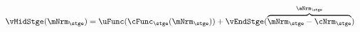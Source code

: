   \begin{equation}\begin{gathered}\begin{aligned}
\vMidStge(\mNrm_{\stge}) & = \uFunc(\cFunc_{\stge}(\mNrm_{\stge})) + \vEndStge(\overbrace{\mNrm_{\stge}-\cNrm_{\stge}}^{\aNrm_{\stge}}) \label{eq:vMidStge}
      \end{aligned}\end{gathered}\end{equation}
